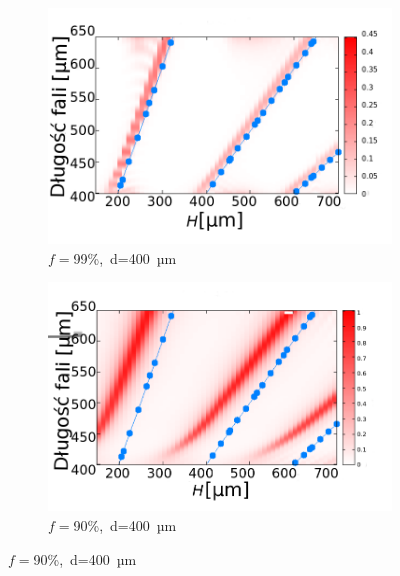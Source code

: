 \begin{figure}[htb]
\begin{subfigure}{0.45\textwidth}
	\includegraphics[width=\textwidth]{images/antenaThz/rezonant_trans_f001.png}
	\caption{$f=$99\%,~d=400~µm }
	\label{fig:rezof001}
\end{subfigure}
\begin{subfigure}{0.45\textwidth}
	\includegraphics[width=\textwidth]{images/antenaThz/rezonant_trans_f01.png}
	\caption{$f=$90\%,~d=400~µm }
	\label{fig:rezof01}
\end{subfigure}


\end{figure}
